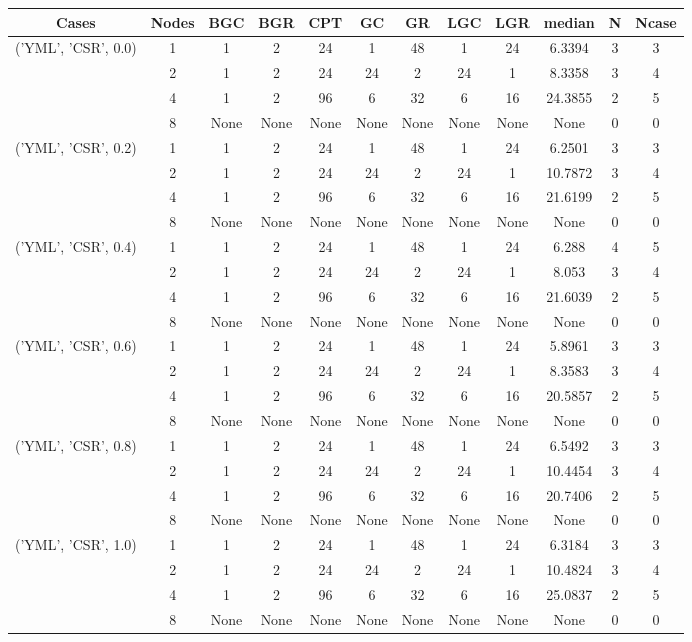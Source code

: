 \begin{tabular}{cccccccccccc}
\hline
Cases & Nodes& BGC& BGR& CPT& GC& GR& LGC& LGR& median & N & Ncase \\
\hline
\multirow{4}{*}{('YML', 'CSR', 0.0)}& 1& 1& 2& 24& 1& 48& 1& 24& 6.3394& 3& 3\\
& 2& 1& 2& 24& 24& 2& 24& 1& 8.3358& 3& 4\\
& 4& 1& 2& 96& 6& 32& 6& 16& 24.3855& 2& 5\\
& 8& None& None& None& None& None& None& None& None& 0& 0\\
\hline
\multirow{4}{*}{('YML', 'CSR', 0.2)}& 1& 1& 2& 24& 1& 48& 1& 24& 6.2501& 3& 3\\
& 2& 1& 2& 24& 24& 2& 24& 1& 10.7872& 3& 4\\
& 4& 1& 2& 96& 6& 32& 6& 16& 21.6199& 2& 5\\
& 8& None& None& None& None& None& None& None& None& 0& 0\\
\hline
\multirow{4}{*}{('YML', 'CSR', 0.4)}& 1& 1& 2& 24& 1& 48& 1& 24& 6.288& 4& 5\\
& 2& 1& 2& 24& 24& 2& 24& 1& 8.053& 3& 4\\
& 4& 1& 2& 96& 6& 32& 6& 16& 21.6039& 2& 5\\
& 8& None& None& None& None& None& None& None& None& 0& 0\\
\hline
\multirow{4}{*}{('YML', 'CSR', 0.6)}& 1& 1& 2& 24& 1& 48& 1& 24& 5.8961& 3& 3\\
& 2& 1& 2& 24& 24& 2& 24& 1& 8.3583& 3& 4\\
& 4& 1& 2& 96& 6& 32& 6& 16& 20.5857& 2& 5\\
& 8& None& None& None& None& None& None& None& None& 0& 0\\
\hline
\multirow{4}{*}{('YML', 'CSR', 0.8)}& 1& 1& 2& 24& 1& 48& 1& 24& 6.5492& 3& 3\\
& 2& 1& 2& 24& 24& 2& 24& 1& 10.4454& 3& 4\\
& 4& 1& 2& 96& 6& 32& 6& 16& 20.7406& 2& 5\\
& 8& None& None& None& None& None& None& None& None& 0& 0\\
\hline
\multirow{4}{*}{('YML', 'CSR', 1.0)}& 1& 1& 2& 24& 1& 48& 1& 24& 6.3184& 3& 3\\
& 2& 1& 2& 24& 24& 2& 24& 1& 10.4824& 3& 4\\
& 4& 1& 2& 96& 6& 32& 6& 16& 25.0837& 2& 5\\
& 8& None& None& None& None& None& None& None& None& 0& 0\\
\hline
\end{tabular}
